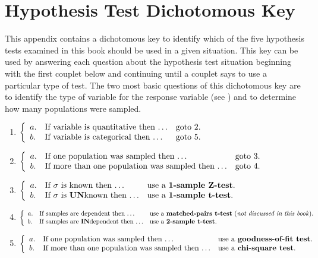 \chapter{Hypothesis Test Dichotomous Key}
\vspace{-40pt}
This appendix contains a dichotomous key to identify which of the five hypothesis tests examined in this book should be used in a given situation.  This key can be used by answering each question about the hypothesis test situation beginning with the first couplet below and continuing until a couplet says to use a particular type of test.  The two most basic questions of this dichotomous key are to identify the type of variable for the response variable (see ) and to determine how many populations were sampled.

\begin{enumerate}
  \item $\left\{
    \begin{array}{lll}
      a. & \hbox{If variable is quantitative then $\ldots$} & \hbox{goto 2.} \\
      b. & \hbox{If variable is categorical then $\ldots$} & \hbox{goto 5.}
    \end{array}
    \right.$
  \item $\left\{
    \begin{array}{lll}
      a. & \hbox{If one population was sampled then $\ldots$} & \hbox{goto 3.} \\
      b. & \hbox{If more than one population was sampled then $\ldots$} & \hbox{goto 4.}
    \end{array}
    \right.$
  \item $\left\{
    \begin{array}{lll}
      a. & \hbox{If $\sigma$ is known then $\ldots$} & \hbox{use a \textbf{1-sample Z-test}.} \\
      b. & \hbox{If $\sigma$ is \textbf{UN}known then $\ldots$} & \hbox{use a \textbf{1-sample t-test}.}
    \end{array}
    \right.$
  \item $\left\{
    \begin{array}{lll}
      a. & \hbox{If samples are dependent then $\ldots$} & \hbox{use a \textbf{matched-pairs t-test} (\textit{not discussed in this book}).} \\
      b. & \hbox{If samples are \textbf{IN}dependent then $\ldots$} & \hbox{use a \textbf{2-sample t-test}.}
    \end{array}
    \right.$
  \item $\left\{
    \begin{array}{lll}
      a. & \hbox{If one population was sampled then $\ldots$} & \hbox{use a \textbf{goodness-of-fit test}.} \\
      b. & \hbox{If more than one population was sampled then $\ldots$} & \hbox{use a \textbf{chi-square test}.}
    \end{array}
    \right.$

\end{enumerate}
